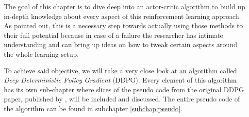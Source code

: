 The goal of this chapter is to dive deep into an actor-critic algorithm to build up in-depth knowledge about every aspect of this reinforcement learning approach. As \cite{tim2018} pointed out, this is a necessary step towards actually using those methods to their full potential because in case of a failure the researcher has intimate understanding and can bring up ideas on how to tweak certain aspects around the whole learning setup.
\par
To achieve said objective, we will take a very close look at an algorithm called \textit{Deep Deterministic Policy Gradient} (DDPG). Every element of this algorithm has its own sub-chapter where slices of the pseudo code from the original DDPG paper, published by \cite{lillicrap2019continuous}, will be included and discussed. The entire pseudo code of the algorithm can be found in subchapter \ref{subchap:pseudo}.

